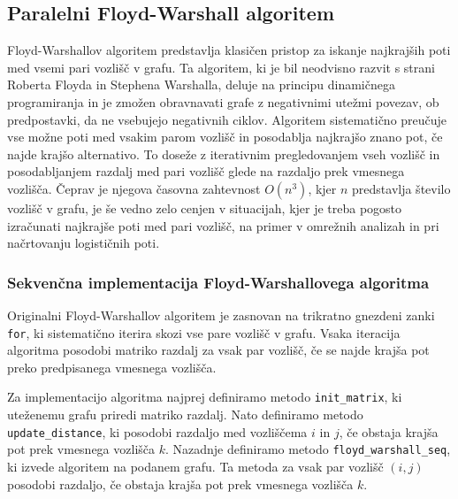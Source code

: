 \documentclass[mat1, tisk]{fmfdelo}
\begin{document}
\subsection{Paralelni Floyd-Warshall algoritem}

Floyd-Warshallov algoritem predstavlja klasičen pristop za iskanje najkrajših poti med vsemi pari vozlišč v grafu.
Ta algoritem, ki je bil neodvisno razvit s strani Roberta Floyda in Stephena Warshalla, deluje na principu dinamičnega
programiranja in je zmožen obravnavati grafe z negativnimi utežmi povezav, ob predpostavki, da ne vsebujejo negativnih ciklov.
Algoritem sistematično preučuje vse možne poti med vsakim parom vozlišč in posodablja najkrajšo znano pot, če najde krajšo alternativo.
To doseže z iterativnim pregledovanjem vseh vozlišč in posodabljanjem razdalj med pari vozlišč glede na razdaljo prek vmesnega vozlišča.
Čeprav je njegova časovna zahtevnost $O(n^3)$, kjer $n$ predstavlja število vozlišč v grafu, je še vedno zelo cenjen v situacijah, kjer
je treba pogosto izračunati najkrajše poti med pari vozlišč, na primer v omrežnih analizah in pri načrtovanju logističnih poti.

\subsubsection{Sekvenčna implementacija Floyd-Warshallovega algoritma}

Originalni Floyd-Warshallov algoritem je zasnovan na trikratno gnezdeni zanki \texttt{for}, ki sistematično iterira skozi vse pare vozlišč v grafu.
Vsaka iteracija algoritma posodobi matriko razdalj za vsak par vozlišč, če se najde krajša pot preko predpisanega vmesnega vozlišča.

Za implementacijo algoritma najprej definiramo metodo \texttt{init\_matrix}, ki uteženemu grafu priredi matriko razdalj.
Nato definiramo metodo \texttt{update\_distance}, ki posodobi razdaljo med vozliščema $i$ in $j$, če obstaja krajša pot prek vmesnega vozlišča $k$.
Nazadnje definiramo metodo \texttt{floyd\_warshall\_seq}, ki izvede algoritem na podanem grafu. Ta metoda za vsak par vozlišč $(i, j)$
posodobi razdaljo, če obstaja krajša pot prek vmesnega vozlišča $k$.
\end{document}
